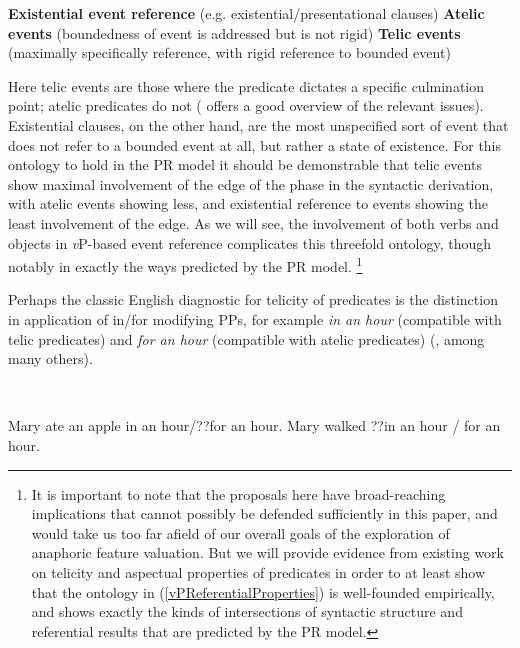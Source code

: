 \begin{xlist}
\ex \textbf{Existential event reference} (e.g. existential/presentational clauses)
\ex \textbf{Atelic events} (boundedness of event is addressed but is not rigid)
\ex \textbf{Telic events} (maximally specifically reference, with rigid reference to bounded event)
\end{xlist}

\z

Here telic events are those where the predicate dictates a specific culmination point; atelic predicates do not (\citealt{Beavers:2012} offers a good overview of the relevant issues). Existential clauses, on the other hand, are the most unspecified sort of event that does not refer to a bounded event at all, but rather a state of existence. For this ontology to hold in the PR model it should be demonstrable that telic events show maximal involvement of the edge of the phase in the syntactic derivation, with atelic events showing less, and existential reference to events showing the least involvement of the edge. As we will see, the involvement of both verbs and objects in \textit{v}P-based event reference complicates this threefold ontology, though notably in exactly the ways predicted by the PR model. \footnote{It is important to note that the proposals here have broad-reaching implications that cannot possibly be defended sufficiently in this paper, and would take us too far afield of our overall goals of the exploration of anaphoric feature valuation. But we will provide evidence from existing work on telicity and aspectual properties of predicates in order to at least show that the ontology in (\ref{vPReferentialProperties}) is well-founded empirically, and shows exactly the kinds of intersections of syntactic structure and referential results that are predicted by the PR model.} %

Perhaps the classic English diagnostic for telicity of predicates is the distinction in application of in/for modifying PPs, for example \textit{in an hour} (compatible with telic predicates) and \textit{for an hour} (compatible with atelic predicates) (\citealt{Vendler:1967,Dowty:1979,Thompson:2006,Beavers:2012}, among many others). 

\ea
{} \\
\begin{xlist}
\ex Mary ate an apple in an hour/??for an hour.   
\ex Mary walked ??in an hour / for an hour.
\end{xlist}

